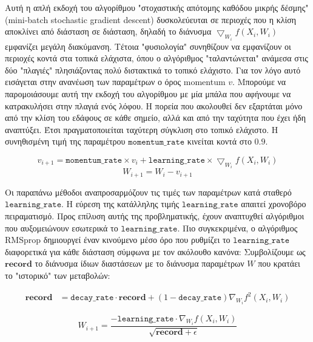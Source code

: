Αυτή η απλή εκδοχή του αλγορίθμου "στοχαστικής απότομης καθόδου μικρής δέσμης" \e (mini-batch stochastic gradient descent) \g δυσκολεύευται σε περιοχές που η κλίση αποκλίνει από διάσταση σε διάσταση, δηλαδή το διάνυσμα $\bigtriangledown_{W_i}f(X_i,W_i)$ εμφανίζει μεγάλη διακύμανση. Τέτοια "φυσιολογία" συνηθίζουν να εμφανίζουν οι περιοχές κοντά στα τοπικά ελάχιστα, όπου ο αλγόριθμος "ταλαντώνεται" ανάμεσα στις δύο "πλαγιές" πλησιάζοντας πολύ διστακτικά το τοπικό ελάχιστο. Για τον λόγο αυτό εισάγεται στην ανανέωση των παραμέτρων ο όρος momentum $v$. Μπορούμε να παρομοιάσουμε αυτή την εκδοχή του αλγορίθμου με μία μπάλα που αφήνουμε να κατρακυλήσει στην πλαγιά ενός λόφου. Η πορεία που ακολουθεί δεν εξαρτάται μόνο από την κλίση του εδάφους σε κάθε σημείο, αλλά και από την ταχύτητα που έχει ήδη αναπτύξει. Έτσι πραγματοποιείται ταχύτερη σύγκλιση στο τοπικό ελάχιστο. Η συνηθισμένη τιμή της παραμέτρου $\mathtt{momentum\_rate}$ κινείται κοντά στο $0.9$.

$$v_{i+1} = \mathtt{momentum\_rate} \times v_{i} + \mathtt{learning\_rate} \times \bigtriangledown_{W_i}f(X_i,W_i)$$
$$W_{i+1} =W_{i} - v_{i+1}$$

Οι παραπάνω μέθοδοι αναπροσαρμόζουν τις τιμές των παραμέτρων κατά σταθερό $\mathtt{learning\_rate}$. Η εύρεση της κατάλληλης τιμής $\mathtt{learning\_rate}$ απαιτεί χρονοβόρο πειραματισμό. Προς επίλυση αυτής της προβληματικής, έχουν αναπτυχθεί αλγόριθμοι που αυξομειώνουν εσωτερικά το $\mathtt{learning\_rate}$. Πιο συγκεκριμένα, ο αλγόριθμος \e RMSprop \g δημιουργεί έναν κινούμενο μέσο όρο που ρυθμίζει το $\mathtt{learning\_rate}$ διαφορετικά για κάθε διάσταση σύμφωνα με τον ακόλουθο κανόνα:
Συμβολίζουμε ως $\mathbf{record}$ το διάνυσμα ίδιων διαστάσεων με το διάνυσμα παραμέτρων $W$ που κρατάει το "ιστορικό" των μεταβολών:

\begin{equation}
	\begin{split}
		\mathbf{record} &= \mathtt{decay\_rate} \cdot \mathbf{record}+ (1-\mathtt{decay\_rate}) \nabla_{W_{i}}f^2(X_i,W_i)
	\end{split}
\end{equation}

$$W_{i+1} = \dfrac{-\mathtt{learning\_rate} \cdot \nabla_{W_{i}}f(X_i,W_i)}{\sqrt{\mathbf{record} + \epsilon}}$$
	


